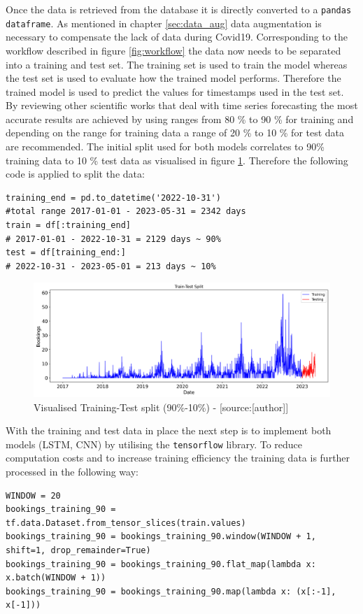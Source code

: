Once the data is retrieved from the database it is directly converted to a \verb|pandas dataframe|. As mentioned in chapter \ref{sec:data_aug} data augmentation is necessary to compensate the lack of data during Covid19. Corresponding to the workflow described in figure \ref{fig:workflow} the data now needs to be separated into a training and test set. The training set is used to train the model whereas the test set is used to evaluate how the trained model performs. Therefore the trained model is used to predict the values for timestamps used in the test set. By reviewing other scientific works that deal with time series forecasting \cite{1d_cnn}\cite{cnn_vechicle}\cite{cnn_intro}\cite{lstm_overcome_rnn_problem}\cite{lstm_module}\cite{lstm_stock} the most accurate results are achieved by using ranges from 80 \% to 90 \% for training and depending on the range for training data a range of 20 \% to 10 \% for test data are recommended. The initial split used for both models correlates to 90\% training data to 10 \% test data as visualised in figure \ref{fig:training_test}. Therefore the following code is applied to split the data:
\begin{lstlisting}
training_end = pd.to_datetime('2022-10-31')
#total range 2017-01-01 - 2023-05-31 = 2342 days
train = df[:training_end]
# 2017-01-01 - 2022-10-31 = 2129 days ~ 90%
test = df[training_end:]
# 2022-10-31 - 2023-05-01 = 213 days ~ 10%
\end{lstlisting}
\begin{figure}[H]
	\centering
		\includegraphics[width=14cm]{images/1st_model_training_split}
	\caption{Visualised Training-Test split (90\%-10\%) - [source:[author]]}
	\label{fig:training_test}
\end{figure}
With the training and test data in place the next step is to implement both models (LSTM, CNN) by utilising the \verb|tensorflow| library. To reduce computation costs and to increase training efficiency the training data is further processed in the following way:
\begin{lstlisting}
WINDOW = 20
bookings_training_90 = tf.data.Dataset.from_tensor_slices(train.values)
bookings_training_90 = bookings_training_90.window(WINDOW + 1, shift=1, drop_remainder=True)
bookings_training_90 = bookings_training_90.flat_map(lambda x: x.batch(WINDOW + 1))
bookings_training_90 = bookings_training_90.map(lambda x: (x[:-1], x[-1]))
\end{lstlisting}
